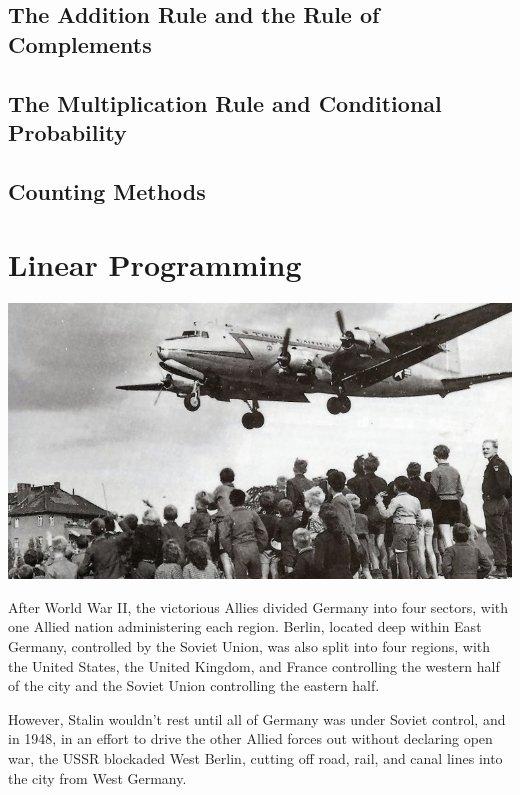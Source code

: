 \documentclass[9pt,letter,twoside,openright]{memoir}
\begin{document}
\section{The Addition Rule and the Rule of Complements}


\section{The Multiplication Rule and Conditional Probability}


\section{Counting Methods}


\chapter{Linear Programming}
\begin{center}\includegraphics[width=\textwidth]{BerlinAirlift}\end{center}

After World War II, the victorious Allies divided Germany into four sectors, with one Allied nation administering each region.  Berlin, located deep within East Germany, controlled by the Soviet Union, was also split into four regions, with the United States, the United Kingdom, and France controlling the western half of the city and the Soviet Union controlling the eastern half.

However, Stalin wouldn't rest until all of Germany was under Soviet control, and in 1948, in an effort to drive the other Allied forces out without declaring open war, the USSR blockaded West Berlin, cutting off road, rail, and canal lines into the city from West Germany.
\end{document}
